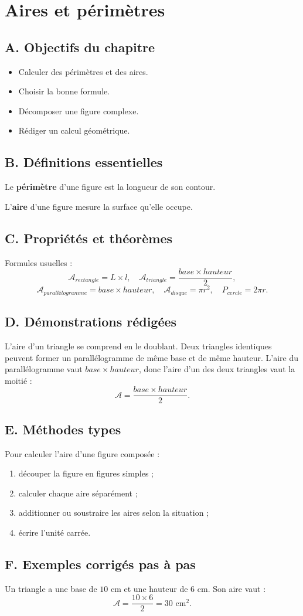 \documentclass[11pt,a4paper]{article}
\newcommand{\chapitre}[1]{
\clearpage
\section{#1}
}
\newcommand{\objectif}[1]{\subsection*{A. Objectifs du chapitre}#1}
\newcommand{\defs}{\subsection*{B. Définitions essentielles}}
\newcommand{\props}{\subsection*{C. Propriétés et théorèmes}}
\newcommand{\demos}{\subsection*{D. Démonstrations rédigées}}
\newcommand{\methodes}{\subsection*{E. Méthodes types}}
\newcommand{\exemples}{\subsection*{F. Exemples corrigés pas à pas}}
\begin{document}
\chapitre{Aires et périmètres}

\objectif{
\begin{itemize}
\item Calculer des périmètres et des aires.
\item Choisir la bonne formule.
\item Décomposer une figure complexe.
\item Rédiger un calcul géométrique.
\end{itemize}}

\defs
\begin{definitionbox}
Le \textbf{périmètre} d'une figure est la longueur de son contour.

L'\textbf{aire} d'une figure mesure la surface qu'elle occupe.
\end{definitionbox}

\props
\begin{proprietebox}
Formules usuelles :
\[
\mathcal A_{rectangle}=L\times l,\quad \mathcal A_{triangle}=\frac{base\times hauteur}{2},
\]
\[
\mathcal A_{parallélogramme}=base\times hauteur,
\quad \mathcal A_{disque}=\pi r^2,
\quad P_{cercle}=2\pi r.
\]
\end{proprietebox}

\demos
\begin{preuvebox}
L'aire d'un triangle se comprend en le doublant. Deux triangles identiques peuvent former un parallélogramme de même base et de même hauteur. L'aire du parallélogramme vaut $base\times hauteur$, donc l'aire d'un des deux triangles vaut la moitié :
\[
\mathcal A=\frac{base\times hauteur}{2}.
\]
\end{preuvebox}

\methodes
\begin{methodebox}
Pour calculer l'aire d'une figure composée :
\begin{enumerate}
\item découper la figure en figures simples ;
\item calculer chaque aire séparément ;
\item additionner ou soustraire les aires selon la situation ;
\item écrire l'unité carrée.
\end{enumerate}
\end{methodebox}

\exemples
\begin{exemplebox}
Un triangle a une base de $10$ cm et une hauteur de $6$ cm. Son aire vaut :
\[
\mathcal A=\frac{10\times 6}{2}=30\text{ cm}^2.
\]
\end{exemplebox}
\end{document}
